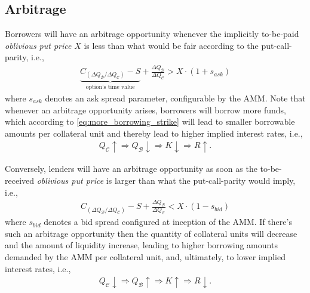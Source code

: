 \documentclass[a4paper]{article}
\begin{document}
\subsection{Arbitrage}
\label{sec:arbitrage}
Borrowers will have an arbitrage opportunity whenever the implicitly to-be-paid \emph{oblivious put price} $X$ is less than what would be fair according to the put-call-parity, i.e.,
\begin{equation}
\begin{split}
\label{eq:arbitrage_borrowers}
\underbrace{C_{(\Delta Q_\mathcal{B} / \Delta Q_\mathcal{C})} - S}_{\textrm{option's time value}} + \frac{\Delta Q_\mathcal{B}}{\Delta Q_\mathcal{C}} > X \cdot (1+s_{ask})
\end{split}
\end{equation}
where $s_{ask}$ denotes an ask spread parameter, configurable by the AMM. Note that whenever an arbitrage opportunity arises, borrowers will borrow more funds, which according to \cref{eq:more_borrowing_strike} will lead to smaller borrowable amounts per collateral unit and thereby lead to higher implied interest rates, i.e.,
\begin{equation}
\begin{split}
Q_\mathcal{C}\uparrow \Rightarrow Q_\mathcal{B}\downarrow \Rightarrow K\downarrow \Rightarrow R\uparrow.
\end{split}
\end{equation}

Conversely, lenders will have an arbitrage opportunity as soon as the to-be-received \emph{oblivious put price} is larger than what the put-call-parity would imply, i.e.,
\begin{equation}
\label{eq:option_premium_lenders}
\begin{split}
C_{(\Delta Q_\mathcal{B} / \Delta Q_\mathcal{C})} - S + \frac{\Delta Q_\mathcal{B}}{\Delta Q_\mathcal{C}} < X \cdot (1-s_{bid})
\end{split}
\end{equation}
where $s_{bid}$ denotes a bid spread configured at inception of the AMM. If there's such an arbitrage opportunity then the quantity of collateral units will decrease and the amount of liquidity increase, leading to higher borrowing amounts demanded by the AMM per collateral unit, and, ultimately, to lower implied interest rates, i.e.,
\begin{equation}
\begin{split}
Q_\mathcal{C}\downarrow \Rightarrow Q_\mathcal{B}\uparrow \Rightarrow K\uparrow \Rightarrow R\downarrow.
\end{split}
\end{equation}
\end{document}
